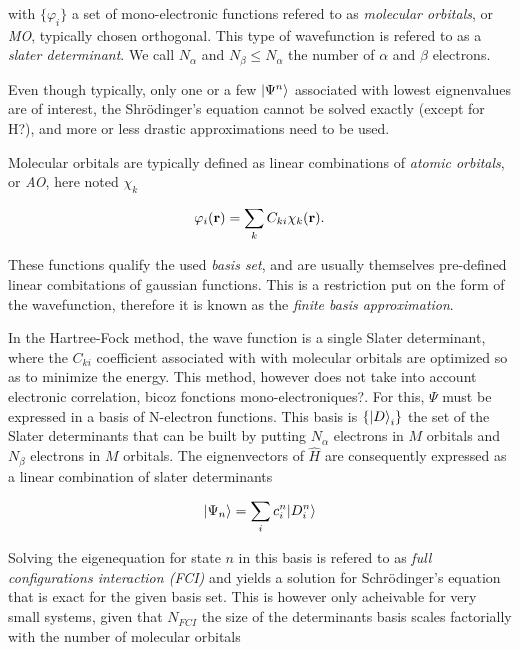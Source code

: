 \documentclass[./thesis.tex]{subfiles}
\begin{document}
with $\{ \varphi_i \}$ a set of mono-electronic functions refered to as \emph{molecular orbitals}, or \emph{MO}, typically chosen orthogonal. This type of wavefunction is refered to as a \emph{slater determinant}. We call $N_\alpha$ and $N_\beta \leq N_\alpha$ the number of $\alpha$ and $\beta$ electrons.

Even though typically, only one or a few $\ket{\Psi^n}$ associated with lowest eignenvalues are of interest, the Shrödinger's equation cannot be solved exactly \alert{(except for H?)}, and more or less drastic approximations need to be used. 

Molecular orbitals are typically defined as linear combinations of \emph{atomic orbitals}, or \emph{AO}, here noted $\chi_k$

\begin{equation}
 \varphi_i({\bf r}) = \sum_k C_{ki} \chi_k({\bf r}).
\end{equation}

These functions qualify the used \emph{basis set}, and are usually themselves pre-defined linear combitations of gaussian functions. This is a restriction put on the form of the wavefunction, therefore it is known as the \emph{finite basis approximation}.

In the Hartree-Fock method, the wave function is a single Slater determinant, where the $C_{ki}$ coefficient associated with with molecular orbitals are optimized so as to minimize the energy. This method, however does not take into account electronic correlation, \alert{bicoz fonctions mono-electroniques?}. For this, $\Psi$ must be expressed in a basis of N-electron functions. This basis is $\{\ket D_i \}$ the set of the Slater determinants that can be built by putting $N_\alpha$ electrons in $M$ orbitals and $N_\beta$ electrons in $M$ orbitals.
The eignenvectors of $\widehat{H}$ are consequently expressed as a linear combination of slater determinants 

\begin{equation}
\ket{\Psi_n} = \sum_{i} c_i^n |D_i^n \rangle 
\end{equation}

Solving the eigenequation for state $n$ in this basis is refered to as \emph{full configurations interaction (FCI)} and yields a solution for Schrödinger's equation that is exact for the given basis set.
This is however only acheivable for very small systems, given that $N_{FCI}$ the size of the determinants basis scales \alert{factorially} with the number of molecular orbitals
\end{document}
